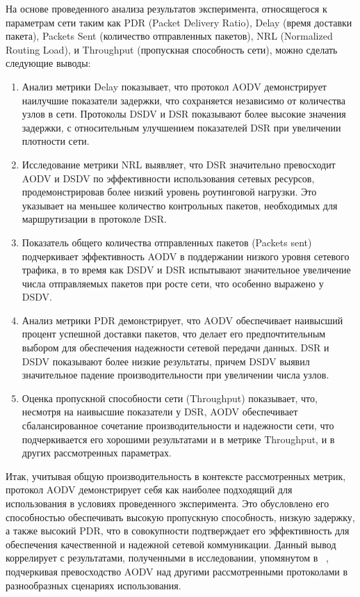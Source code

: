 На основе проведенного анализа результатов эксперимента, относящегося к параметрам сети таким как PDR (Packet Delivery Ratio), Delay (время доставки пакета), Packets Sent (количество отправленных пакетов), NRL (Normalized Routing Load), и Throughput (пропускная способность сети), можно сделать следующие выводы:

\begin{enumerate}
    \item Анализ метрики Delay показывает, что протокол AODV демонстрирует наилучшие показатели задержки, что сохраняется независимо от количества узлов в сети. Протоколы DSDV и DSR показывают более высокие значения задержки, с относительным улучшением показателей DSR при увеличении плотности сети.

    \item Исследование метрики NRL выявляет, что DSR значительно превосходит AODV и DSDV по эффективности использования сетевых ресурсов, продемонстрировав более низкий уровень роутинговой нагрузки. Это указывает на меньшее количество контрольных пакетов, необходимых для маршрутизации в протоколе DSR.

    \item Показатель общего количества отправленных пакетов (Packets sent) подчеркивает эффективность AODV в поддержании низкого уровня сетевого трафика, в то время как DSDV и DSR испытывают значительное увеличение числа отправляемых пакетов при росте сети, что особенно выражено у DSDV.

    \item Анализ метрики PDR демонстрирует, что AODV обеспечивает наивысший процент успешной доставки пакетов, что делает его предпочтительным выбором для обеспечения надежности сетевой передачи данных. DSR и DSDV показывают более низкие результаты, причем DSDV выявил значительное падение производительности при увеличении числа узлов.

    \item Оценка пропускной способности сети (Throughput) показывает, что, несмотря на наивысшие показатели у DSR, AODV обеспечивает сбалансированное сочетание производительности и надежности сети, что подчеркивается его хорошими результатами и в метрике Throughput, и в других рассмотренных параметрах.
\end{enumerate}

Итак, учитывая общую производительность в контексте рассмотренных метрик, протокол AODV демонстрирует себя как наиболее подходящий для использования в условиях проведенного эксперимента. Это обусловлено его способностью обеспечивать высокую пропускную способность, низкую задержку, а также высокий PDR, что в совокупности подтверждает его эффективность для обеспечения качественной и надежной сетевой коммуникации. Данный вывод коррелирует с результатами, полученными в исследовании, упомянутом в ~\cite{rizwan2018vanet}, подчеркивая превосходство AODV над другими рассмотренными протоколами в разнообразных сценариях использования.

